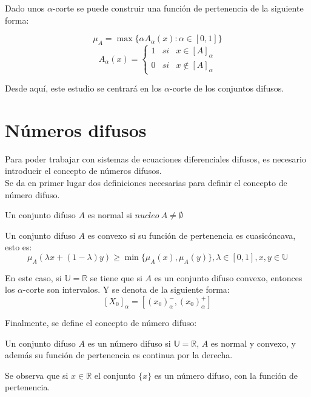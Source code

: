 Dado unos $\alpha$-corte se puede construir una función de pertenencia de la siguiente forma: \cite{apuntesfuzzy}

\[
\mu_A = \max{\{\alpha A_\alpha(x) : \alpha \in [0, 1]}\}
\]
\[
A_\alpha(x) = \left\{
\begin{array}{ccc}
  1 & si & x \in [A]_\alpha \\
  0 & si & x \notin [A]_\alpha
\end{array}
\right.
\]

Desde aquí, este estudio se centrará en los $\alpha$-corte de los conjuntos difusos.

\section{Números difusos}
Para poder trabajar con sistemas de ecuaciones diferenciales difusos, es necesario introducir el concepto de números difusos. \\
Se da en primer lugar dos definiciones necesarias para definir el concepto de número difuso.

\begin{definicion}
  \label{def:difuso_normal}
  Un conjunto difuso $A$ es normal si $nucleo ~ A \neq \emptyset$
\end{definicion}

\begin{definicion}
  \label{def:difuso_convexo}
  Un conjunto difuso $A$ es convexo si su función de pertenencia es cuasicóncava, esto es:
  \[
  \mu_A(\lambda x + (1-\lambda)y) \geq \min{\{\mu_A(x), \mu_A(y)\}}, \lambda \in [0, 1], x, y \in \mathbb{U}
  \]
\end{definicion}

En este caso, si $\mathbb{U}=\mathbb{R}$ se tiene que si $A$ es un conjunto difuso convexo, entonces los $\alpha$-corte son intervalos. Y se denota de la siguiente forma:
\[
  [X_0]_\alpha = [(x_0)_\alpha^- , (x_0)_\alpha^+]
  \]

  Finalmente, se define el concepto de número difuso:

  \begin{definicion}
    \label{def:numero_difuso}
    Un conjunto difuso $A$ es un número difuso si $\mathbb{U}=\mathbb{R}$, $A$ es normal y convexo, y además su función de pertenencia es continua por la derecha.
  \end{definicion}


  Se observa que si $x \in \mathbb{R}$ el conjunto $\{x\}$ es un número difuso, con la función de pertenencia.


